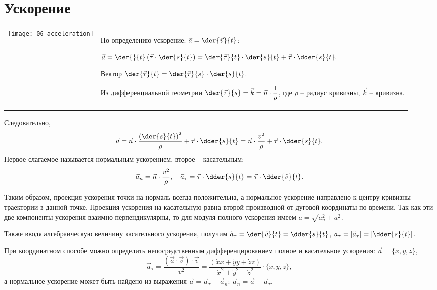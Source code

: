 \section{Ускорение}
\begin{table}[h!]
    \begin{tabular}{C{.4}m{.55\textwidth}}
        \texttt{[image: 06\_acceleration]} &
        По определению ускорение: \( \ds \vec{a} = \der{\vec{v}}{t} \):
        
        \( \ds \vec{a} = \der{}{t}\left(\vec{\tau}\cdot\der{s}{t}\right) =
        \der{\vec{\tau}}{t}\cdot\der{s}{t} + \vec{\tau}\cdot\dder{s}{t}. \)
        
        Вектор \( \ds \der{\vec{\tau}}{t} = \der{\vec{\tau}}{s}\cdot\der{s}{t} \).
        
        Из дифференциальной геометрии \( \ds \der{\vec{\tau}}{s} = \vec{k} =
        \vec{n}\cdot\frac{1}{\rho} \), где \( \rho \) -- радиус кривизны,
        \( \vec{k} \) -- кривизна. 
    \end{tabular}
\end{table}

Следовательно,
\[
    \vec{a} = \vec{n}\cdot\frac{\left(\der{s}{t}\right)^2}{\rho} + \vec{\tau}
    \cdot\dder{s}{t} = \vec{n}\cdot\frac{v^2}{\rho}+ \vec{\tau}\cdot\dder{s}{t}.
\]
Первое слагаемое называется нормальным ускорением, второе -- касательным:
\[
    \vec{a}_n = \vec{n}\cdot\frac{v^2}{\rho}, \quad \vec{a}_\tau =
    \vec{\tau}\cdot\dder{s}{t} = \vec{\tau}\cdot\dder{\tilde{v}}{t}.
\]

Таким образом, проекция ускорения точки на нормаль всегда положительна, а
нормальное ускорение направлено к центру кривизны траектории в данной точке.
Проекция ускорения на касательную равна второй производной от дуговой координаты
по времени. Так как эти две компоненты ускорения взаимно перпендикулярны, то для
модуля полного ускорения имеем \( a = \sqrt{a_n^2 + a_\tau^2} \).

Также вводя алгебраическую величину касательного ускорения, получим
\( \ds \tilde{a}_\tau = \der{\tilde{v}}{t} = \dder{s}{t} \),
\( \ds a_\tau = |\tilde{a}_\tau| = \left|\dder{s}{t}\right| \).

При координатном способе можно определить непосредственным дифференцированием
полное и касательное ускорения: \( \vec{a} = \bigl\{ \ddot{x}, \ddot{y},
\ddot{z}\bigr\} \),
\[
    \vec{a}_\tau = \frac{(\vec{a}\cdot\vec{v})\cdot\vec{v}}{v^2} = \frac{(
    \dot{x}\ddot{x} + \dot{y}\ddot{y} + \dot{z}\ddot{z})}{\dot{x}^2 + \dot{y}^2
    + \dot{z}^2}\cdot\bigl\{\dot{x}, \dot{y}, \dot{z}\bigr\},
\]
а нормальное ускорение может быть найдено из выражения \( \vec{a} = \vec{a}_\tau
+ \vec{a}_n \): \( \vec{a}_n = \vec{a} - \vec{a}_\tau \).

\newpage

